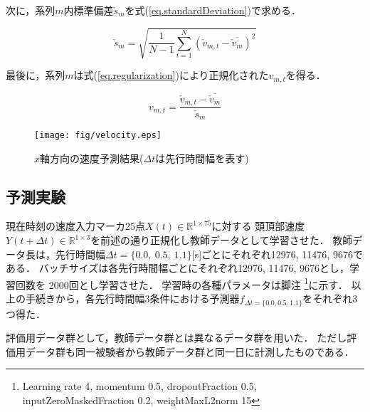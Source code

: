 \documentclass{sigchi}
\begin{document}
次に，系列$m$内標準偏差$\check{s}_m$を式(\ref{eq.standardDeviation})で求める．

\begin{equation}
  \check{s}_m = \sqrt{ \frac{1}{N-1}\sum^{N}_{t=1} ( \check{v}_{m,t} - \overline{\check{v}_m} ) ^2} 			
\label{eq.standardDeviation}
\end{equation}

最後に，系列$m$は式(\ref{eq.regularization})により正規化された$ v_{m,t} $を得る．

\begin{equation}
  v_{m,t} = \frac{\check{v}_{m,t} - \overline{\check{v}_{m}}}{\check{s}_m} 
  \label{eq.regularization}
\end{equation}


\begin{figure*}[tb]
  \begin{center}
    \texttt{[image: fig/velocity.eps]}
  \end{center}
  \vspace*{-10mm}
  \caption{$x$軸方向の速度予測結果($\Delta t$は先行時間幅を表す)}
  \label{fig-velocity-result}
\end{figure*}

\subsection{予測実験}
現在時刻の速度入力マーカ25点$X(t) \in \mathbb{R}^{1 \times 75}$に対する
頭頂部速度$Y(t + \Delta t) \in \mathbb{R}^{1 \times 3}$を前述の通り正規化し教師データとして学習させた．
教師データ長は，先行時間幅$\Delta  t =\{0.0, \ 0.5,\  1.1\} $[s]ごとにそれぞれ12976, 11476,  9676である．
バッチサイズは各先行時間幅ごとにそれぞれ12976, 11476, 9676とし，学習回数を 2000回とし学習させた．
学習時の各種パラメータは脚注
\footnote{Learning rate  4, momentum 0.5, dropoutFraction 0.5, 
inputZeroMaskedFraction 0.2, weightMaxL2norm 15}に示す．
以上の手続きから，各先行時間幅3条件における予測器$f_{\Delta t = \{0.0, 0.5, 1.1\}}$をそれぞれ3つ得た．

評価用データ群として，教師データ群とは異なるデータ群を用いた．
ただし評価用データ群も同一被験者から教師データ群と同一日に計測したものである．


%
%
\end{document}
